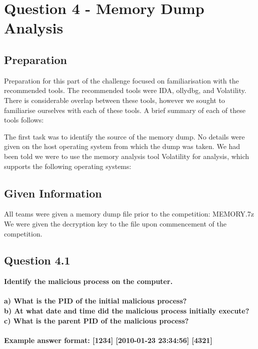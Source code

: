 \lstset{basicstyle=\tiny}

\chapter{Question 4 - Memory Dump Analysis}

\section{Preparation}
Preparation for this part of the challenge focused on familiarisation with the recommended tools. The recommended tools were IDA, ollydbg, and Volatility. There is considerable overlap between these tools, however we sought to familiarise ourselves with each of these tools. A brief summary of each of these tools follows:

The first task was to identify the source of the memory dump. No details were given on the host operating system from which the dump was taken. We had been told we were to use the memory analysis tool Volatility for analysis, which supports the following operating systems:



\section{Given Information}
All teams were given a memory dump file prior to the competition: MEMORY.7z\\
We were given the decryption key to the file upon commencement of the
competition.

\section{Question 4.1}
\textbf{Identify the malicious process on the computer.
\\\\
a) What is the PID of the initial malicious process?
\\b) At what date and time did the malicious process initially execute?
\\c) What is the parent PID of the malicious process?
\\\\
Example answer format: [1234] [2010-01-23 23:34:56] [4321]}
